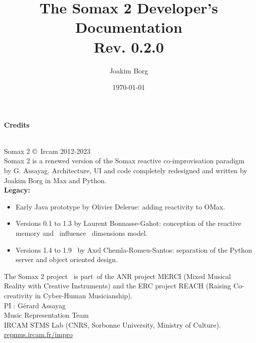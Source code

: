 \documentclass[10pt]{report}
\title{The Somax 2 Developer's Documentation\\[0.24cm]
	\large{Rev. 0.2.0}}
\author{Joakim Borg }
\date{\today}
\begin{document}
\maketitle
\chapter*{}
\large{\textbf{Credits}\\}\\
\small{
Somax 2 \copyright \ Ircam 2012-2023\\

\noindent Somax 2 is a renewed version of the Somax reactive co-improvisation paradigm by G. Assayag.
Architecture, UI and code completely redesigned and written by Joakim Borg in Max and Python.
\\

\noindent \textbf{Legacy:}
\begin{itemize}
\item Early Java prototype by Olivier Delerue: adding reactivity to OMax.
\item Versions 0.1 to 1.3 by Laurent Bonnasse-Gahot: conception of the reactive memory and  influence  dimensions model.
\item Versions 1.4 to 1.9  by Axel Chemla-Romeu-Santos: separation of the Python server and object oriented design.
\end{itemize}

\medskip
\noindent The Somax 2 project  is part of the ANR project MERCI (Mixed Musical Reality with Creative Instruments) and the ERC project REACH (Raising Co-creativity in Cyber-Human Musicianship).
\\

\noindent PI : Gérard Assayag\\
Music Representation Team\\
IRCAM STMS Lab (CNRS, Sorbonne University, Ministry of Culture).
\\

\noindent\url{repmus.ircam.fr/impro}
}


\tableofcontents








\appendix





{}

\end{document}
